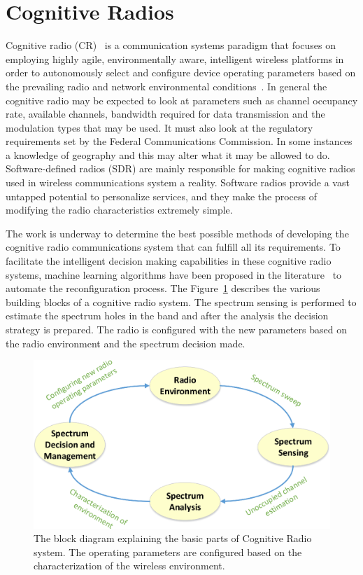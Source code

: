 \section{Cognitive Radios}
Cognitive radio (CR)~\cite{cogjm} is a communication systems paradigm that focuses on employing highly agile, environmentally aware, intelligent wireless platforms in
order to autonomously select and configure device operating parameters based on the prevailing radio and network environmental conditions~\cite{bookhtn1}. In general the cognitive radio may be expected to look at parameters such as channel occupancy rate, available channels, bandwidth required for data transmission and the modulation types that may be used. It must also look at the regulatory requirements set by the Federal Communications Commission. In some instances a knowledge of geography and this may alter what it may be allowed to do. Software-defined radios (SDR) are mainly responsible for making cognitive radios used in wireless communications system a reality. Software radios provide a vast untapped potential to personalize services, and they make the process of modifying the radio characteristics extremely simple. 

The work is underway to determine the best possible methods of developing the cognitive radio communications system that can fulfill all its requirements. To facilitate the intelligent decision making capabilities in these cognitive radio systems, machine learning algorithms have been proposed in the literature~\cite{barker2008mission,haykin2005cognitive,newman2007cognitive,newman2008population} to automate the reconfiguration process. The Figure~\ref{cograd} describes the various building blocks of a cognitive radio system. The spectrum sensing is performed to estimate the spectrum holes in the band and after the analysis the decision strategy is prepared. The radio is configured with the new parameters based on the radio environment and the spectrum decision made.  

\begin{figure}[ht!]
	\centering
	\includegraphics[width=\textwidth,keepaspectratio]{images/Gill/figs/cognitive_radio.eps}
    \caption{The block diagram explaining the basic parts of Cognitive Radio system. The operating parameters are configured based on the characterization of the wireless environment.} 
\label{cograd}      
\end{figure}


